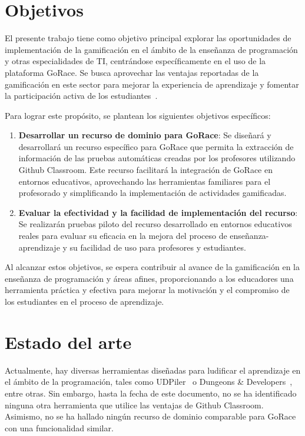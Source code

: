 \section{Objetivos}
El presente trabajo tiene como objetivo principal explorar las oportunidades de implementación de la gamificación en el ámbito de la enseñanza de programación y otras especialidades de \acrshort{TI}, centrándose específicamente en el uso de la plataforma GoRace. Se busca aprovechar las ventajas reportadas de la gamificación en este sector para mejorar la experiencia de aprendizaje y fomentar la participación activa de los estudiantes~\cite{EmpiricalBenefitProgramming, ZHAN2022100096}.

Para lograr este propósito, se plantean los siguientes objetivos específicos:
\begin{enumerate}
    \item \textbf{Desarrollar un recurso de dominio para GoRace}: Se diseñará y desarrollará un recurso específico para GoRace que permita la extracción de información de las pruebas automáticas creadas por los profesores utilizando Github Classroom. Este recurso facilitará la integración de GoRace en entornos educativos, aprovechando las herramientas familiares para el profesorado y simplificando la implementación de actividades gamificadas.
    \item \textbf{Evaluar la efectividad y la facilidad de implementación del recurso}: Se realizarán pruebas piloto del recurso desarrollado en entornos educativos reales para evaluar su eficacia en la mejora del proceso de enseñanza-aprendizaje y su facilidad de uso para profesores y estudiantes.
\end{enumerate}

Al alcanzar estos objetivos, se espera contribuir al avance de la gamificación en la enseñanza de programación y áreas afines, proporcionando a los educadores una herramienta práctica y efectiva para mejorar la motivación y el compromiso de los estudiantes en el proceso de aprendizaje.

\section{Estado del arte}
Actualmente, hay diversas herramientas diseñadas para ludificar el aprendizaje en el ámbito de la programación, tales como UDPiler~\cite{EmpiricalBenefitProgramming} o Dungeons \& Developers~\cite{dungeonsanddevelopers}, entre otras. Sin embargo, hasta la fecha de este documento, no se ha identificado ninguna otra herramienta que utilice las ventajas de Github Classroom. Asimismo, no se ha hallado ningún recurso de dominio comparable para GoRace con una funcionalidad similar.

